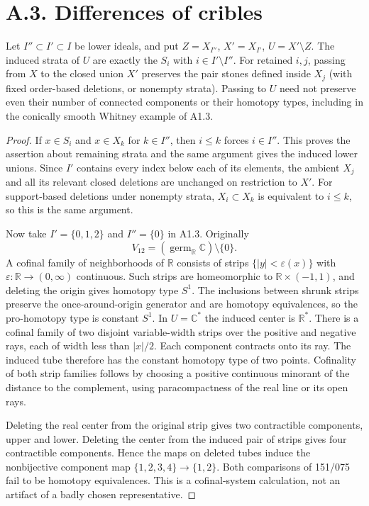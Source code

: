 \section{A.3. Differences of cribles}
\begin{result}\label{A3.1}
Let $I''\subset I'\subset I$ be lower ideals, and put
$Z=X_{I''}$, $X'=X_{I'}$, $U=X'\setminus Z$. The induced strata of $U$
are exactly the $S_i$ with $i\in I'\setminus I''$. For retained $i,j$,
passing from $X$ to the closed union $X'$ preserves the pair stones
defined inside $X_j$ (with fixed order-based deletions, or nonempty strata).
Passing to $U$ need not preserve even their number of connected
components or their homotopy types, including in the conically smooth
Whitney example of A1.3.
\end{result}
\begin{proof}
If $x\in S_i$ and $x\in X_k$ for $k\in I''$, then $i\leq k$ forces
$i\in I''$. This proves the assertion about remaining strata and the
same argument gives the induced lower unions. Since $I'$ contains every
index below each of its elements, the ambient $X_j$ and all its relevant
closed deletions are unchanged on restriction to $X'$. For support-based
deletions under nonempty strata, $X_i\subset X_k$ is equivalent to
$i\leq k$, so this is the same argument.

Now take $I'=\{0,1,2\}$ and $I''=\{0\}$ in A1.3. Originally
\[
 V_{12}=(\operatorname{germ}_{\mathbb R}\mathbb C)\setminus\{0\}.
\]
A cofinal family of neighborhoods of $\mathbb R$ consists of strips
$\{|y|<\varepsilon(x)\}$ with $\varepsilon:\mathbb R\to(0,\infty)$
continuous. Such strips are homeomorphic to $\mathbb R\times(-1,1)$,
and deleting the origin gives homotopy type $S^1$. The inclusions between
shrunk strips preserve the once-around-origin generator and are homotopy
equivalences, so the pro-homotopy type is constant $S^1$.
In $U=\mathbb C^*$ the induced center is $\mathbb R^*$.
There is a cofinal family of two disjoint variable-width strips over the
positive and negative rays, each of width less than $|x|/2$. Each
component contracts onto its ray. The induced tube therefore has the
constant homotopy type of two points. Cofinality of both strip families
follows by choosing a positive continuous minorant of the distance to
the complement, using paracompactness of the real line or its open rays.

Deleting the real center from the original strip gives two contractible
components, upper and lower. Deleting the center from the induced pair
of strips gives four contractible components. Hence the maps on deleted
tubes induce the nonbijective component map $\{1,2,3,4\}\to\{1,2\}$.
Both comparisons of 151/075 fail to be homotopy equivalences. This is a
cofinal-system calculation, not an artifact of a badly chosen representative.
\end{proof}

